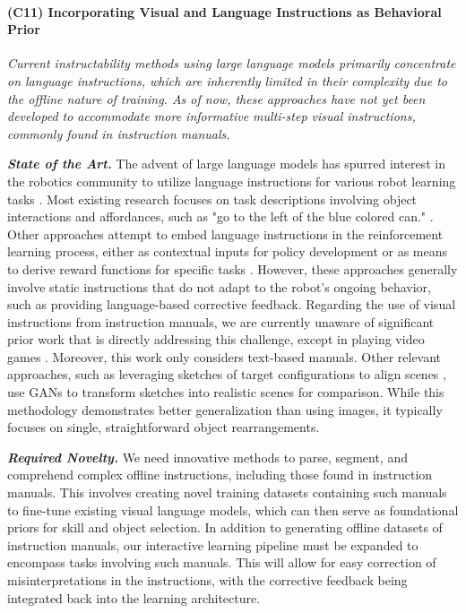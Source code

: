\documentclass{erc-B2}
\begin{document}
\paragraph{(C11) Incorporating Visual and Language Instructions as Behavioral Prior}
\textit{Current instructability methods using large language models primarily concentrate on language instructions, which are inherently limited in their complexity due to the offline nature of training. As of now, these approaches have not yet been developed to accommodate more informative multi-step visual instructions, commonly found in instruction manuals.}


\textbf{\textit{State of the Art.}} The advent of large language models has spurred interest in the robotics community to utilize language instructions for various robot learning tasks \cite{saycan2022arxiv}. Most existing research focuses on task descriptions involving object interactions and affordances, such as "go to the left of the blue colored can." \cite{Pratyusha2020CorrectingNLF}. Other approaches attempt to embed language instructions in the reinforcement learning process, either as contextual inputs for policy development \cite{nair2021learning} or as means to derive reward functions for specific tasks \cite{yu2023language}. However, these approaches generally involve static instructions that do not adapt to the robot's ongoing behavior, such as providing language-based corrective feedback.
Regarding the use of visual instructions from instruction manuals, we are currently unaware of significant prior work that is directly addressing this challenge, except in playing video games \cite{wu2023read}. Moreover, this work only considers text-based manuals. Other relevant approaches, such as leveraging sketches of target configurations to align scenes \cite{Sundaresan2023RTSketch}, use GANs \cite{goodfellow2014gan} to transform sketches into realistic scenes for comparison. While this methodology demonstrates better generalization than using images, it typically focuses on single, straightforward object rearrangements.

\textit{\textbf{Required Novelty.}} We need innovative methods to parse, segment, and comprehend complex offline instructions, including those found in instruction manuals. This involves creating novel training datasets containing such manuals to fine-tune existing visual language models, which can then serve as foundational priors for skill and object selection. In addition to generating offline datasets of instruction manuals, our interactive learning pipeline must be expanded to encompass tasks involving such manuals. This will allow for easy correction of misinterpretations in the instructions, with the corrective feedback being integrated back into the learning architecture.
\end{document}
